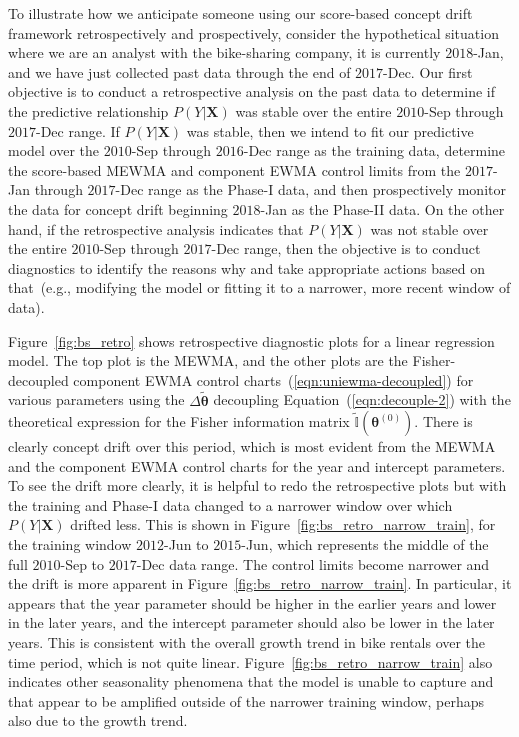 \documentclass[twoside,11pt]{article}
\begin{document}
To illustrate how we anticipate someone using our score-based concept drift framework retrospectively and prospectively, consider the hypothetical situation where we are an analyst with the bike-sharing company, it is currently $2018$-Jan, and we have just collected past data through the end of $2017$-Dec. Our first objective is to conduct a retrospective analysis on the past data to determine if the predictive relationship $P(Y|\bm{X})$ was stable over the entire $2010$-Sep through $2017$-Dec range. If $P(Y|\bm{X})$ was stable, then we intend to fit our predictive model over the $2010$-Sep through $2016$-Dec range as the training data, determine the score-based MEWMA and component EWMA control limits from the $2017$-Jan through $2017$-Dec range as the Phase-I data, and then prospectively monitor the data for concept drift beginning $2018$-Jan as the Phase-II data. On the other hand, if the retrospective analysis indicates that $P(Y|\bm{X})$ was not stable over the entire $2010$-Sep through $2017$-Dec range, then the objective is to conduct diagnostics to identify the reasons why and take appropriate actions based on that~(e.g., modifying the model or fitting it to a narrower, more recent window of data).

Figure~\ref{fig:bs_retro} shows retrospective diagnostic plots for a linear regression model. The top plot is the MEWMA, and the other plots are the Fisher-decoupled component EWMA control charts~(\ref{eqn:uniewma-decoupled}) for various parameters using the $\Delta \tilde{\bm { \theta}}$ decoupling Equation~(\ref{eqn:decouple-2}) with the theoretical expression for the Fisher information matrix $\widetilde{\mathbb {I}}(\bm { \theta}^{ (0)})$. There is clearly concept drift over this period, which is most evident from the MEWMA and the component EWMA control charts for the year and intercept parameters. To see the drift more clearly, it is helpful to redo the retrospective plots but with the training and Phase-I data changed to a narrower window over which $P(Y|\bm{X})$ drifted less. This is shown in Figure~\ref{fig:bs_retro_narrow_train}, for the training window $2012$-Jun to $2015$-Jun, which represents the middle of the full $2010$-Sep to $2017$-Dec data range. The control limits become narrower and the drift is more apparent in Figure~\ref{fig:bs_retro_narrow_train}. In particular, it appears that the year parameter should be higher in the earlier years and lower in the later years, and the intercept parameter should also be lower in the later years. This is consistent with the overall growth trend in bike rentals over the time period, which is not quite linear. Figure~\ref{fig:bs_retro_narrow_train} also indicates other seasonality phenomena that the model is unable to capture and that appear to be amplified outside of the narrower training window, perhaps also due to the growth trend.  
\end{document}
